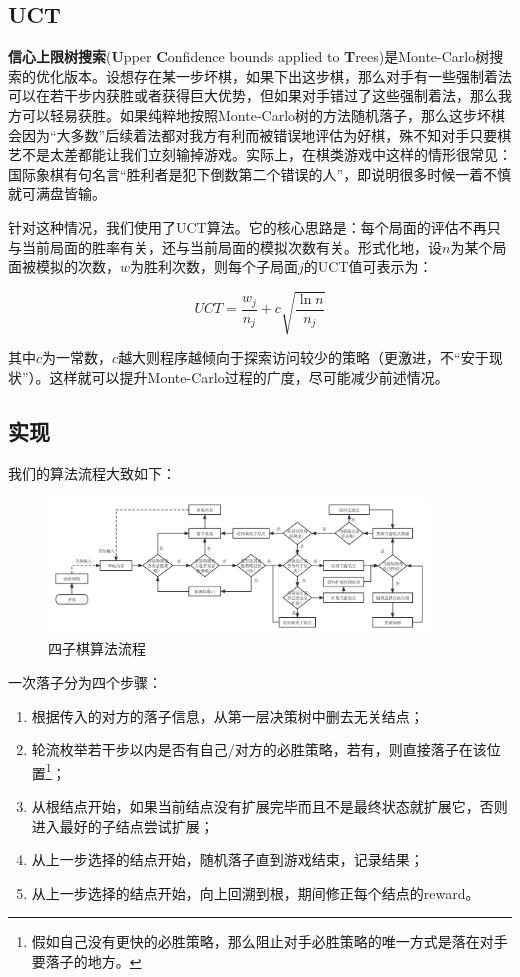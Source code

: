 \documentclass{article}
\begin{document}
	\subsection{UCT}
	
	\textbf{信心上限树搜索}(\textbf{U}pper \textbf{C}onfidence bounds applied to \textbf{T}rees)是Monte-Carlo树搜索的优化版本。设想存在某一步坏棋，如果下出这步棋，那么对手有一些强制着法可以在若干步内获胜或者获得巨大优势，但如果对手错过了这些强制着法，那么我方可以轻易获胜。如果纯粹地按照Monte-Carlo树的方法随机落子，那么这步坏棋会因为“大多数”后续着法都对我方有利而被错误地评估为好棋，殊不知对手只要棋艺不是太差都能让我们立刻输掉游戏。实际上，在棋类游戏中这样的情形很常见：国际象棋有句名言“胜利者是犯下倒数第二个错误的人”，即说明很多时候一着不慎就可满盘皆输。
	
	针对这种情况，我们使用了UCT算法。它的核心思路是：每个局面的评估不再只与当前局面的胜率有关，还与当前局面的模拟次数有关。形式化地，设$n$为某个局面被模拟的次数，$w$为胜利次数，则每个子局面$j$的UCT值可表示为：
	
	\begin{equation}
		UCT = \frac{w_j}{n_j} + c\sqrt{\frac{\ln{n}}{n_j}}
	\end{equation}

	其中$c$为一常数，$c$越大则程序越倾向于探索访问较少的策略（更激进，不“安于现状”）。这样就可以提升Monte-Carlo过程的广度，尽可能减少前述情况。
	
	\subsection{实现}
	
	我们的算法流程大致如下：
	
	\begin{figure}[ht]
		\centering
		\includegraphics[width=0.9\textwidth]{procedure.png}
		\caption{四子棋算法流程}
	\end{figure}
	
	一次落子分为四个步骤：
	\begin{enumerate}
		\item 根据传入的对方的落子信息，从第一层决策树中删去无关结点；
		\item 轮流枚举若干步以内是否有自己/对方的必胜策略，若有，则直接落子在该位置\footnote{假如自己没有更快的必胜策略，那么阻止对手必胜策略的唯一方式是落在对手要落子的地方。}；
		\item 从根结点开始，如果当前结点没有扩展完毕而且不是最终状态就扩展它，否则进入最好的子结点尝试扩展；
		\item 从上一步选择的结点开始，随机落子直到游戏结束，记录结果；
		\item 从上一步选择的结点开始，向上回溯到根，期间修正每个结点的reward。
	\end{enumerate}
	
\end{document}
